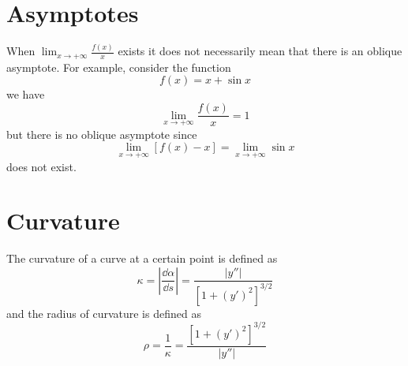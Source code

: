 \documentclass{overview}
\begin{document}
\section{Asymptotes}

When $\lim_{x \to +\infty}\frac{ f(x)}{x}$ exists it does not necessarily mean that
there is an oblique asymptote. For example, consider the function
\[
	f(x) = x + \sin x
\]
we have
\[
	\lim_{x \to +\infty} \frac{f(x)}{x} = 1
\]
but there is no oblique asymptote since 
\[
	\lim_{x \to +\infty} [f(x) - x] = \lim_{x \to +\infty} \sin x
\]
does not exist.

\section{Curvature}

The curvature of a curve at a certain point is defined as
\[
	\kappa = \left| \frac{\dd \alpha}{\dd s} \right| = 
	\frac{|y''|}{[1 + (y')^2]^{3/2}}
\]
and the radius of curvature is defined as
\[
	\rho = \frac{1}{\kappa} = \frac{[1 + (y')^2]^{3/2}}{|y''|}
\]
\end{document}
